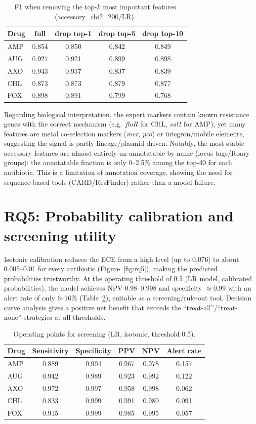 \documentclass[../main.tex]{subfiles}
\begin{document}
\begin{table}[H]
\centering
\caption{F1 when removing the top-$k$ most important features (accessory\_chi2\_200/LR).}
\label{tab:dropout}
\begin{tabular}{lcccc}
\hline
Drug & full & drop top-1 & drop top-5 & drop top-10 \\ \hline
AMP & 0.854 & 0.850 & 0.842 & 0.849 \\
AUG & 0.927 & 0.921 & 0.899 & 0.898 \\
AXO & 0.943 & 0.937 & 0.837 & 0.839 \\
CHL & 0.873 & 0.873 & 0.879 & 0.877 \\
FOX & 0.898 & 0.891 & 0.799 & 0.768 \\ \hline
\end{tabular}
\end{table}

Regarding biological interpretation, the expert markers contain known resistance genes with the correct mechanism (e.g.\ \textit{floR} for CHL, \textit{sul1} for AMP), yet many features are metal co-selection markers (\textit{mer}, \textit{pco}) or integron/mobile elements, suggesting the signal is partly lineage/plasmid-driven. Notably, the most stable accessory features are almost entirely un-annotatable by name (locus tags/Roary groups): the annotatable fraction is only 0--2.5\% among the top-40 for each antibiotic. This is a limitation of annotation coverage, showing the need for sequence-based tools (CARD/ResFinder) rather than a model failure.

\section{RQ5: Probability calibration and screening utility}

Isotonic calibration reduces the ECE from a high level (up to 0.076) to about 0.005--0.01 for every antibiotic (Figure~\ref{fig:rq5}), making the predicted probabilities trustworthy. At the operating threshold of 0.5 (LR model, calibrated probabilities), the model achieves NPV 0.98--0.998 and specificity $\approx 0.99$ with an alert rate of only 6--16\% (Table~\ref{tab:rq5}), suitable as a screening/rule-out tool. Decision curve analysis gives a positive net benefit that exceeds the ``treat-all''/``treat-none'' strategies at all thresholds.

\begin{table}[H]
\centering
\caption{Operating points for screening (LR, isotonic, threshold 0.5).}
\label{tab:rq5}
\begin{tabular}{lccccc}
\hline
Drug & Sensitivity & Specificity & PPV & NPV & Alert rate \\ \hline
AMP & 0.889 & 0.994 & 0.967 & 0.978 & 0.157 \\
AUG & 0.942 & 0.989 & 0.923 & 0.992 & 0.122 \\
AXO & 0.972 & 0.997 & 0.958 & 0.998 & 0.062 \\
CHL & 0.833 & 0.999 & 0.991 & 0.980 & 0.091 \\
FOX & 0.915 & 0.999 & 0.985 & 0.995 & 0.057 \\ \hline
\end{tabular}
\end{table}
\end{document}
